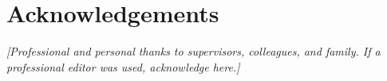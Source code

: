 \chapter*{Acknowledgements}

\textit{[Professional and personal thanks to supervisors, colleagues, and family. If a professional editor was used, acknowledge here.]}
